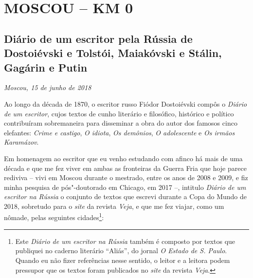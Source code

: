 \movetooddpage
{}
\part*{MOSCOU -- KM 0}

\chapter*{Diário de um escritor pela Rússia de Dostoiévski e Tolstói, Maiakóvski e Stálin, Gagárin e Putin}

\begin{flushright}
\emph{Moscou, 15 de junho de 2018}
\end{flushright}

Ao longo da década de 1870, o escritor russo Fiódor Dostoiévski compôs o
\emph{Diário de um escritor}, cujos textos de cunho literário e
filosófico, histórico e político contribuíram sobremaneira para
disseminar a obra do autor dos famosos cinco elefantes: \emph{Crime e
castigo}, \emph{O idiota}, \emph{Os demônios}, \emph{O adolescente} e
\emph{Os irmãos Karamázov}.

Em homenagem ao escritor que eu venho estudando com afinco há mais de
uma década e que me fez viver em ambas as fronteiras da Guerra Fria que
hoje parece rediviva -- vivi em Moscou durante o mestrado, entre os anos
de 2008 e 2009, e fiz minha pesquisa de pós"-doutorado em Chicago, em
2017 --, intitulo \emph{Diário de um escritor na Rússia} o conjunto de
textos que escrevi durante a Copa do Mundo de 2018, sobretudo para o
\emph{site} da revista \emph{Veja}, e que me fez viajar, como um nômade,
pelas seguintes cidades\footnote{Este \emph{Diário de um escritor na
  Rússia} também é composto por textos que publiquei no caderno
  literário ``Aliás'', do jornal \emph{O Estado de S. Paulo}. Quando eu
  não fizer referências nesse sentido, o leitor e a leitora podem
  pressupor que os textos foram publicados no \emph{site} da revista
  \emph{Veja}.}:

